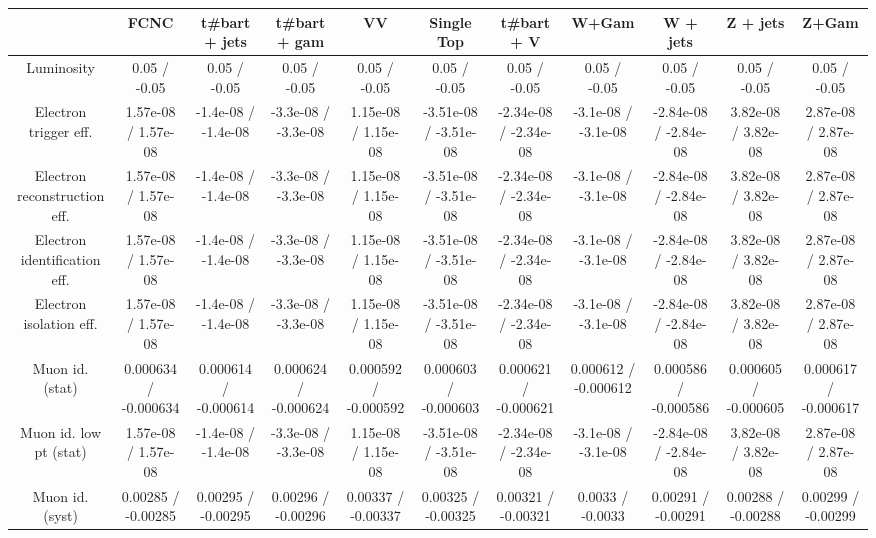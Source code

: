 \begin{table}[htbp]
\begin{center}
\footnotesize
\begin{tabular}{|c|c|c|c|c|c|c|c|c|c|c|}
\hline 
      & FCNC      & t#bar{t} + jets      & t#bar{t} +  gam      & VV      & Single Top      & t#bar{t} + V      & W+Gam      & W + jets      & Z + jets      & Z+Gam \\ 
\hline 
  Luminosity & 0.05 / -0.05 & 0.05 / -0.05 & 0.05 / -0.05 & 0.05 / -0.05 & 0.05 / -0.05 & 0.05 / -0.05 & 0.05 / -0.05 & 0.05 / -0.05 & 0.05 / -0.05 & 0.05 / -0.05 \\ 
  Electron trigger eff. & 1.57e-08 / 1.57e-08 & -1.4e-08 / -1.4e-08 & -3.3e-08 / -3.3e-08 & 1.15e-08 / 1.15e-08 & -3.51e-08 / -3.51e-08 & -2.34e-08 / -2.34e-08 & -3.1e-08 / -3.1e-08 & -2.84e-08 / -2.84e-08 & 3.82e-08 / 3.82e-08 & 2.87e-08 / 2.87e-08 \\ 
  Electron reconstruction eff. & 1.57e-08 / 1.57e-08 & -1.4e-08 / -1.4e-08 & -3.3e-08 / -3.3e-08 & 1.15e-08 / 1.15e-08 & -3.51e-08 / -3.51e-08 & -2.34e-08 / -2.34e-08 & -3.1e-08 / -3.1e-08 & -2.84e-08 / -2.84e-08 & 3.82e-08 / 3.82e-08 & 2.87e-08 / 2.87e-08 \\ 
  Electron identification eff. & 1.57e-08 / 1.57e-08 & -1.4e-08 / -1.4e-08 & -3.3e-08 / -3.3e-08 & 1.15e-08 / 1.15e-08 & -3.51e-08 / -3.51e-08 & -2.34e-08 / -2.34e-08 & -3.1e-08 / -3.1e-08 & -2.84e-08 / -2.84e-08 & 3.82e-08 / 3.82e-08 & 2.87e-08 / 2.87e-08 \\ 
  Electron isolation eff. & 1.57e-08 / 1.57e-08 & -1.4e-08 / -1.4e-08 & -3.3e-08 / -3.3e-08 & 1.15e-08 / 1.15e-08 & -3.51e-08 / -3.51e-08 & -2.34e-08 / -2.34e-08 & -3.1e-08 / -3.1e-08 & -2.84e-08 / -2.84e-08 & 3.82e-08 / 3.82e-08 & 2.87e-08 / 2.87e-08 \\ 
  Muon id. (stat) & 0.000634 / -0.000634 & 0.000614 / -0.000614 & 0.000624 / -0.000624 & 0.000592 / -0.000592 & 0.000603 / -0.000603 & 0.000621 / -0.000621 & 0.000612 / -0.000612 & 0.000586 / -0.000586 & 0.000605 / -0.000605 & 0.000617 / -0.000617 \\ 
  Muon id. low pt (stat) & 1.57e-08 / 1.57e-08 & -1.4e-08 / -1.4e-08 & -3.3e-08 / -3.3e-08 & 1.15e-08 / 1.15e-08 & -3.51e-08 / -3.51e-08 & -2.34e-08 / -2.34e-08 & -3.1e-08 / -3.1e-08 & -2.84e-08 / -2.84e-08 & 3.82e-08 / 3.82e-08 & 2.87e-08 / 2.87e-08 \\ 
  Muon id. (syst) & 0.00285 / -0.00285 & 0.00295 / -0.00295 & 0.00296 / -0.00296 & 0.00337 / -0.00337 & 0.00325 / -0.00325 & 0.00321 / -0.00321 & 0.0033 / -0.0033 & 0.00291 / -0.00291 & 0.00288 / -0.00288 & 0.00299 / -0.00299 \\ 

\end{tabular}
\end{center}
\end{table}
